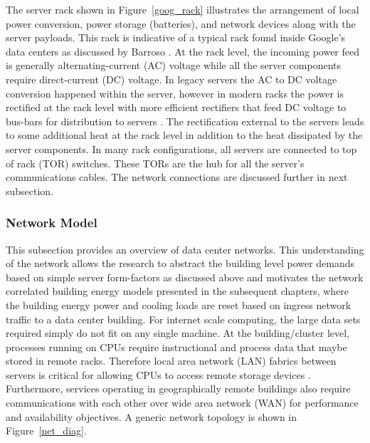             
            
            The server rack shown in Figure~\ref{goog_rack} illustrates the arrangement of local power conversion, power storage (batteries), and network devices along with the server payloads. This rack is indicative of a typical rack found inside Google's data centers as discussed by Barroso \cite{barroso13}. At the rack level, the incoming power feed is generally alternating-current (AC) voltage while all the server components require direct-current (DC) voltage. In legacy servers the AC to DC voltage conversion happened within the server, however in modern racks the power is rectified at the rack level with more efficient rectifiers that feed DC voltage to bus-bars for distribution to servers \cite{open_compute_48V}. The rectification external to the servers leads to some additional heat at the rack level in addition to the heat dissipated by the server components. In many rack configurations, all servers are connected to top of rack (TOR) switches. These TORs are the hub for all the server's communications cables. The network connections are discussed further in next subsection. 
    
        \subsubsection{Network Model}
        \label{Network}
        
        This subsection provides an overview of data center networks. This understanding of the network allows the research to abstract the building level power demands based on simple server form-factors as discussed above and motivates the network correlated building energy models presented in the subsequent chapters, where the building energy power and cooling loads are reset based on ingress network traffic to a data center building. For internet scale computing, the large data sets required simply do not fit on any single machine. At the building/cluster level, processes running on CPUs require instructional and process data that maybe stored in remote racks. Therefore local area network (LAN) fabrics between servers is critical for allowing CPUs to access remote storage devices \cite{mccullough2012enabling}. Furthermore, services operating in geographically remote buildings also require communications with each other over wide area network (WAN) for performance and availability objectives. A generic network topology is shown in Figure~\ref{net_diag}.
        
